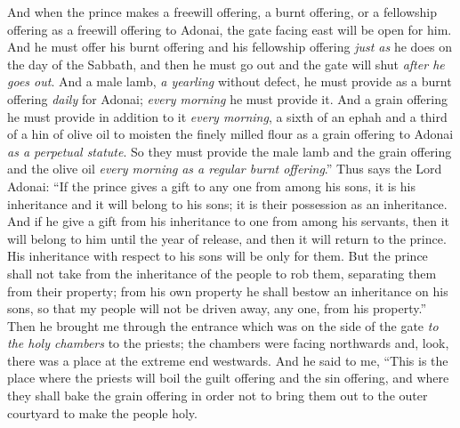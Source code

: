 \begin{biblechapter}
\verse And when the prince makes a freewill offering, a burnt offering, or a fellowship offering as a freewill offering to Adonai, the gate facing east will be open for him. And he must offer his burnt offering and his fellowship offering \textit{just as} he does on the day of the Sabbath, and then he must go out and the gate will shut \textit{after he goes out}.
\verse And a male lamb, \textit{a yearling} without defect, he must provide as a burnt offering \textit{daily} for Adonai; \textit{every morning} he must provide it.
\verse And a grain offering he must provide in addition to it \textit{every morning}, a sixth of an ephah and a third of a hin of olive oil to moisten the finely milled flour as a grain offering to Adonai \textit{as a perpetual statute}.
\verse So they must provide the male lamb and the grain offering and the olive oil \textit{every morning} \textit{as a regular burnt offering}.”
\verse Thus says the Lord Adonai: “If the prince gives a gift to any one from among his sons, it is his inheritance and it will belong to his sons; it is their possession as an inheritance.
\verse And if he give a gift from his inheritance to one from among his servants, then it will belong to him until the year of release, and then it will return to the prince. His inheritance with respect to his sons will be only for them.
\verse But the prince shall not take from the inheritance of the people to rob them, separating them from their property; from his own property he shall bestow an inheritance on his sons, so that my people will not be driven away, any one, from his property.”
\verse Then he brought me through the entrance which was on the side of the gate \textit{to the holy chambers} to the priests; the chambers were facing northwards and, look, there was a place at the extreme end westwards.
\verse And he said to me, “This is the place where the priests will boil the guilt offering and the sin offering, and where they shall bake the grain offering in order not to bring them out to the outer courtyard to make the people holy.

\end{biblechapter}
